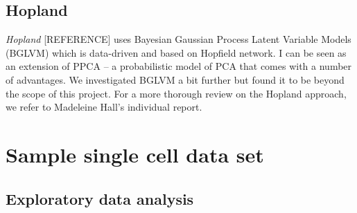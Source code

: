 \documentclass[journal, a4paper]{IEEEtran}
\begin{document}
\subsection{Hopland}
\textit{Hopland} [REFERENCE] uses Bayesian Gaussian Process Latent Variable Models (BGLVM) which is data-driven and based on Hopfield network. I can be seen as an extension of PPCA -- a probabilistic model of PCA that comes with a number of advantages.
We investigated BGLVM a bit further but found it to be beyond the scope of this project.
For a more thorough review on the Hopland approach, we refer to Madeleine Hall's individual report.




\section{Sample single cell data set}



\subsection{Exploratory data analysis}
\end{document}
